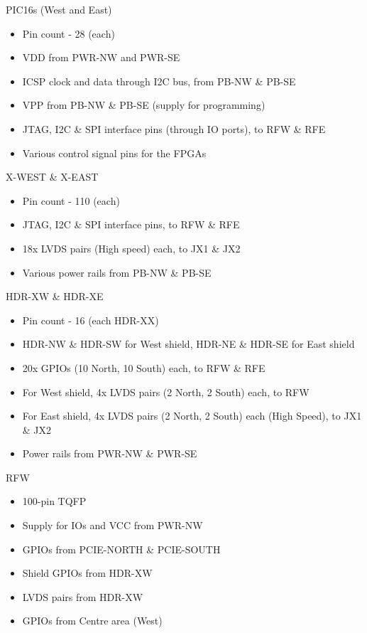 \documentclass{beamer}
\begin{document}
\begin{frame}{PIC16s (West and East)}
    \begin{itemize}
    \item Pin count - 28 (each)
    \item VDD from PWR-NW and PWR-SE
    \item ICSP clock and data through I2C bus, from PB-NW \& PB-SE
    \item VPP from PB-NW \& PB-SE (supply for programming)
    \item JTAG, I2C \& SPI interface pins (through IO ports), to RFW \& RFE
    \item Various control signal pins for the FPGAs
    \end{itemize}
\end{frame}

\begin{frame}{X-WEST \& X-EAST}
    \begin{itemize}
    \item Pin count - 110 (each)
    \item JTAG, I2C \& SPI interface pins, to RFW \& RFE
    \item 18x LVDS pairs (High speed) each, to JX1 \& JX2
    \item Various power rails from PB-NW \& PB-SE
    \end{itemize}
\end{frame}

\begin{frame}{HDR-XW \& HDR-XE}
    \begin{itemize}
    \item Pin count - 16 (each HDR-XX)
    \item HDR-NW \& HDR-SW for West shield, HDR-NE \& HDR-SE for East shield
    \item 20x GPIOs (10 North, 10 South) each, to RFW \& RFE 
    \item For West shield, 4x LVDS pairs (2 North, 2 South) each, to RFW 
    \item For East shield, 4x LVDS pairs (2 North, 2 South) each (High Speed), to JX1 \& JX2
    \item Power rails from PWR-NW \& PWR-SE
    \end{itemize}
\end{frame}

\begin{frame}{RFW}
    \begin{itemize}
    \item 100-pin TQFP
    \item Supply for IOs and VCC from PWR-NW
    \item GPIOs from PCIE-NORTH \& PCIE-SOUTH
    \item Shield GPIOs from HDR-XW 
    \item LVDS pairs from HDR-XW
    \item GPIOs from Centre area (West)  
    \end{itemize}
\end{frame}
\end{document}
